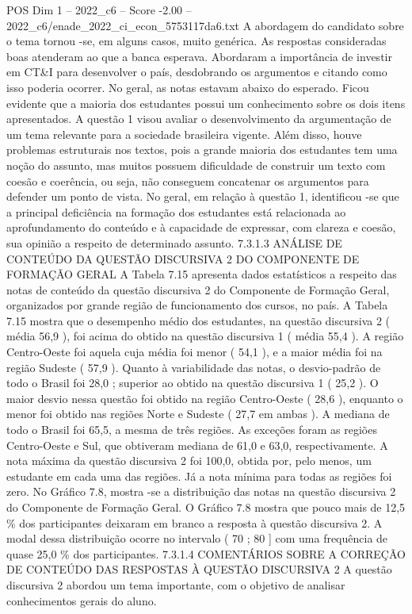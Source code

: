 \begin{textsample}{POS Dim 1 – 2022\_c6 – Score -2.00 – 2022\_c6/enade\_2022\_ci\_econ\_5753117da6.txt}
A abordagem do candidato sobre o tema tornou -se, em alguns casos, muito genérica.
As respostas consideradas boas atenderam ao que a banca esperava.
Abordaram a importância de investir em CT\&I para desenvolver o país, desdobrando os argumentos e citando como isso poderia ocorrer.
No geral, as notas estavam abaixo do esperado.
Ficou evidente que a maioria dos estudantes possui um conhecimento sobre os dois itens apresentados.
A questão 1 visou avaliar o desenvolvimento da argumentação de um tema relevante para a sociedade brasileira vigente.
Além disso, houve problemas estruturais nos textos, pois a grande maioria dos estudantes tem uma noção do assunto, mas muitos possuem dificuldade de construir um texto com coesão e coerência, ou seja, não conseguem concatenar os argumentos para defender um ponto de vista.
No geral, em relação à questão 1, identificou -se que a principal deficiência na formação dos estudantes está relacionada ao aprofundamento do conteúdo e à capacidade de expressar, com clareza e coesão, sua opinião a respeito de determinado assunto. 7.3.1.3 ANÁLISE DE CONTEÚDO DA QUESTÃO DISCURSIVA 2 DO COMPONENTE DE FORMAÇÃO GERAL A Tabela 7.15 apresenta dados estatísticos a respeito das notas de conteúdo da questão discursiva 2 do Componente de Formação Geral, organizados por grande região de funcionamento dos cursos, no país.
A Tabela 7.15 mostra que o desempenho médio dos estudantes, na questão discursiva 2 ( média 56,9 ), foi acima do obtido na questão discursiva 1 ( média 55,4 ).
A região Centro-Oeste foi aquela cuja média foi menor ( 54,1 ), e a maior média foi na região Sudeste ( 57,9 ).
Quanto à variabilidade das notas, o desvio-padrão de todo o Brasil foi 28,0 ; superior ao obtido na questão discursiva 1 ( 25,2 ).
O maior desvio nessa questão foi obtido na região Centro-Oeste ( 28,6 ), enquanto o menor foi obtido nas regiões Norte e Sudeste ( 27,7 em ambas ).
A mediana de todo o Brasil foi 65,5, a mesma de três regiões.
As exceções foram as regiões Centro-Oeste e Sul, que obtiveram mediana de 61,0 e 63,0, respectivamente.
A nota máxima da questão discursiva 2 foi 100,0, obtida por, pelo menos, um estudante em cada uma das regiões.
Já a nota mínima para todas as regiões foi zero.
No Gráfico 7.8, mostra -se a distribuição das notas na questão discursiva 2 do Componente de Formação Geral.
O Gráfico 7.8 mostra que pouco mais de 12,5 \% dos participantes deixaram em branco a resposta à questão discursiva 2.
A modal dessa distribuição ocorre no intervalo ( 70 ; 80 ] com uma frequência de quase 25,0 \% dos participantes. 7.3.1.4 COMENTÁRIOS SOBRE A CORREÇÃO DE CONTEÚDO DAS RESPOSTAS À QUESTÃO DISCURSIVA 2 A questão discursiva 2 abordou um tema importante, com o objetivo de analisar conhecimentos gerais do aluno.

\end{textsample}
